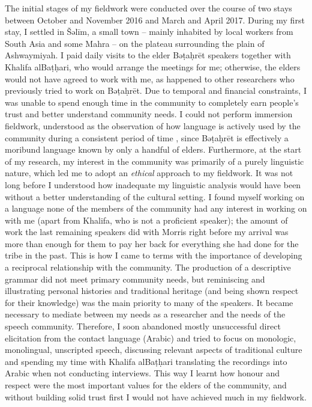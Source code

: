\documentclass[output=paper]{langscibook}
\begin{document}
The initial stages of my fieldwork were conducted over the course of two stays between October and November 2016 and March and April 2017. During my first stay, I settled in Šəlīm, a small town – mainly inhabited by local workers from South Asia and some Mahra – on the plateau surrounding the plain of Ashwaymiyah. I paid daily visits to the elder Bəṭaḥrēt speakers together with Khalifa alBaṭḥari, who would arrange the meetings for me; otherwise, the elders would not have agreed to work with me, as happened to other researchers who previously tried to work on Bəṭaḥrēt. Due to temporal and financial constraints, I was unable to spend enough time in the community to completely earn people’s trust and better understand community needs. I could not perform immersion fieldwork, understood as the observation of how language is actively used by the community during a consistent period of time \citep{aikhenvald_linguistic_2007}, since Bəṭaḥrēt is effectively a moribund language known by only a handful of elders. Furthermore, at the start of my research, my interest in the community was primarily of a purely linguistic nature, which led me to adopt an \textit{ethical} approach to my fieldwork. It was not long before I understood how inadequate my linguistic analysis would have been without a better understanding of the cultural setting. I found myself working on a language none of the members of the community had any interest in working on with me (apart from Khalifa, who is not a proficient speaker); the amount of work the last remaining speakers did with Morris right before my arrival was more than enough for them to pay her back for everything she had done for the tribe in the past. This is how I came to terms with the importance of developing a reciprocal relationship with the community. The production of a descriptive grammar did not meet primary community needs, but reminiscing and illustrating personal histories and traditional heritage (and being shown respect for their knowledge) was the main priority to many of the speakers. It became necessary to mediate between my needs as a researcher and the needs of the speech community. Therefore, I soon abandoned mostly unsuccessful direct elicitation from the contact language (Arabic) and tried to focus on monologic, monolingual, unscripted speech, discussing relevant aspects of traditional culture and spending my time with Khalifa alBaṭḥari translating the recordings into Arabic when not conducting interviews. This way I learnt how honour and respect were the most important values for the elders of the community, and without building solid trust first I would not have achieved much in my fieldwork.
\end{document}
